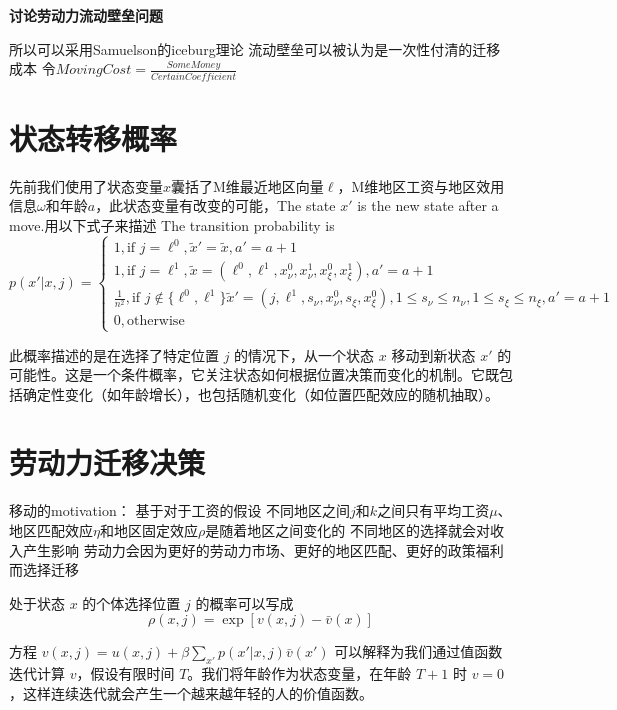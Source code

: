 \documentclass[a4paper,12pt,oneside]{book} %
\begin{document}
\textbf{讨论劳动力流动壁垒问题}

所以可以采用Samuelson的iceburg理论 流动壁垒可以被认为是一次性付清的迁移成本
令$MovingCost = \frac{SomeMoney}{CertainCoefficient}$

\section{状态转移概率}
先前我们使用了状态变量$x$囊括了M维最近地区向量$\ell$，M维地区工资与地区效用信息$\omega$和年龄$a$，此状态变量有改变的可能，The state $x'$ is the new state after a move.用以下式子来描述
The transition probability is 
\begin{equation}
  p(x'|x,j)=
  \begin{cases}
    1, \text{if }j=\ell^0,\tilde x'=\tilde x,a'=a+1
    \\
    1, \text{if }j=\ell^1,\tilde x =(\ell^0,\ell^1,x_\nu^0,x_\nu^1,x_\xi^0,x_\xi^1),a'=a+1
    \\
    \frac{1}{n^2}, \text{if }j \notin \{\ell^0,\ell^1\}\tilde x'=(j,\ell^1,s_\nu,x_\nu^0,s_\xi,x_\xi^0),1\leqslant s_\nu \leqslant n_\nu,1\leqslant s_\xi \leqslant n_\xi,a'=a+1
    \\
    0, \text{otherwise}
  \end{cases}
\end{equation}

此概率描述的是在选择了特定位置 $j$ 的情况下，从一个状态 $x$ 移动到新状态 $x'$ 的可能性。这是一个条件概率，它关注状态如何根据位置决策而变化的机制。它既包括确定性变化（如年龄增长），也包括随机变化（如位置匹配效应的随机抽取）。

\section{劳动力迁移决策}
移动的motivation：
基于对于工资的假设
不同地区之间$j$和$k$之间只有平均工资$\mu$、地区匹配效应$\eta$和地区固定效应$\rho$是随着地区之间变化的
不同地区的选择就会对收入产生影响
劳动力会因为更好的劳动力市场、更好的地区匹配、更好的政策福利而选择迁移


处于状态 $x$ 的个体选择位置 $j$ 的概率可以写成
\begin{equation}
  \rho(x,j)=\exp[v(x,j)-\bar v(x)]
\end{equation}

方程 $v(x, j) = u(x, j) + \beta \sum\limits_{x'} p(x' | x, j) \bar{v}(x')$ 可以解释为我们通过值函数迭代计算 $v$，假设有限时间 $T$。我们将年龄作为状态变量，在年龄 $T+1$ 时 $v=0$，这样连续迭代就会产生一个越来越年轻的人的价值函数。
\end{document}
